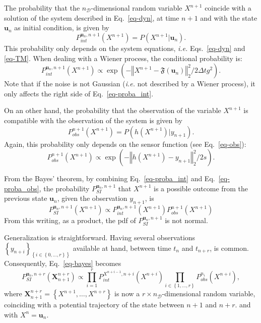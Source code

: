 \documentclass[10pt,openany,onecolumn,a4wide,pof]{article}
\newcommand{\gras}[1]{\boldsymbol{#1}}
\newcommand{\mypar}[1]{\left(#1\right)}
\newcommand{\mya}[1]{\left\{#1\right\}}
\newcommand{\norme}[1]{\left\Vert #1\right\Vert_2}
\newcommand{\Nphaz}{n_{\mathcal{D}}} %
\newcommand{\fint}{\mathfrak{F}} %
\newcommand{\obs}{y} %
\newcommand{\point}{\gras{u}} %
\newcommand{\rpoint}{X}
\begin{document}
The probability that the $\Nphaz$-dimensional random variable $\rpoint^{n+1}$ coincide with a solution of the system described in Eq.~\eqref{eq-dyn}, at time $n+1$ and with the state $\point_{n}$ as initial condition, is given by
$$P^{\point_n,n+1}_{int}\mypar{\rpoint^{n+1}} = P\mypar{\rpoint^{n+1}|\point_n}.$$ 
This probability only depends on the system equations, \emph{i.e.} Eqs.~\eqref{eq-dyn} and \eqref{eq-TM}. When dealing with a Wiener process, the conditional probability is:
\begin{equation}
P^{\point_n,n+1}_{int}\mypar{\rpoint^{n+1}} \propto \exp \mypar{- \norme{\rpoint^{n+1} - \fint\mypar{\point_n}}^2/2\Delta t g^2}.
\label{eq-proba_int}
\end{equation}
Note that if the noise is not Gaussian (\emph{i.e.} not described by a Wiener process), it only affects the right side of Eq.~\eqref{eq-proba_int}.

On an other hand, the probability that the observation of the variable $\rpoint^{n+1}$ is compatible with the observation of the system is given by
$$P^{n+1}_{obs}\mypar{\rpoint^{n+1}} = P\mypar{h\mypar{\rpoint^{n+1}}|\obs_{n+1}}.$$ 
Again, this probability only depends on the sensor function (see
Eq.~\eqref{eq-obs}):
\begin{equation}
 P^{n+1}_{obs}\mypar{\rpoint^{n+1}}  \propto \exp \mypar{- \norme{h\mypar{\rpoint^{n+1}} - y_{n+1}}^2/2s}.
\label{eq-proba_obs}
\end{equation}

From the Bayes' theorem, by combining Eq.~\eqref{eq-proba_int} and Eq.~\eqref{eq-proba_obs}, the probability $P^{\point_n,n+1}_{SI}$ that $\rpoint^{n+1}$ is a possible outcome from the previous state $\point_n$, given the observation $\obs_{n+1}$, is
\begin{equation}
P^{\point_n,n+1}_{SI}\mypar{\rpoint^{n+1}} \propto P^{\point_n,n+1}_{int}\mypar{\rpoint^{n+1}} P^{n+1}_{obs}\mypar{\rpoint^{n+1}}
\label{eq-bayes}
\end{equation}
From this writing, as a product, the pdf of $P^{\point_n,n+1}_{SI}$ is not normal.

Generalization is straightforward. 
Having several observations $\mya{\obs_{n+i}}_{\mya{i\in \mya{0,\hdots,r}}}$ available at hand, between time $t_n$ and $t_{n+r}$, is common. 
Consequently,  Eq.~\eqref{eq-bayes} becomes
\begin{equation}
P^{\point_n,n+r}_{SI}\mypar{\gras{\rpoint}_{n+1}^{n+r}} \propto \prod_{i=1}^r P^{\rpoint^{n+i-1},n+i}_{int}\mypar{\rpoint^{n+i}} \prod_{i\in \mya{1,\hdots,r}} P^{n_i}_{obs}\mypar{\rpoint^{n+i}},
\label{eq-SI}
\end{equation}
where $\gras{\rpoint}_{n+1}^{n+r} = \mya{\rpoint^{n+1}, \hdots,\rpoint^{n+r}}$ is now a $r\times\Nphaz$-dimensional random variable, coinciding with a potential trajectory of the state between $n+1$ and ${n+r}$. and with $\rpoint^n = \point_n$.
\end{document}
